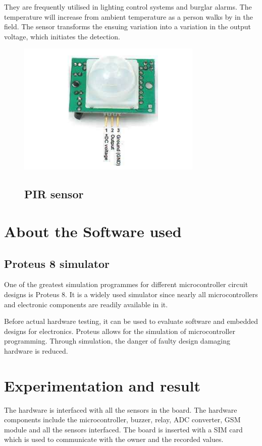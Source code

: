 \documentclass{wsdcr}
\begin{document}
They are frequently utilised in lighting control systems and burglar alarms. The temperature will increase from ambient temperature as a person walks by in the field. The sensor transforms the ensuing variation into a variation in the output voltage, which initiates the detection.
\begin{figure}[t!]
    \centering
    \includegraphics[width=.9\linewidth]{pir.png}
    \caption{ }
\subsection{ PIR sensor }
    \label{fig:example}
\end{figure}

\section{About the Software used}
\subsection{Proteus 8 simulator}
One of the greatest simulation programmes for different microcontroller circuit designs is Proteus 8. It is a widely used simulator since nearly all microcontrollers and electronic components are readily available in it.

Before actual hardware testing, it can be used to evaluate software and embedded designs for electronics. Proteus allows for the simulation of microcontroller programming. Through simulation, the danger of faulty design damaging hardware is reduced.

\section{Experimentation and result}
The hardware is interfaced with all the sensors in the board. 
The hardware components include the microcontroller, 
buzzer, relay, ADC converter, GSM module and all the 
sensors interfaced. The board is inserted with a SIM card 
which is used to communicate with the owner and the 
recorded values. 
\end{document}
